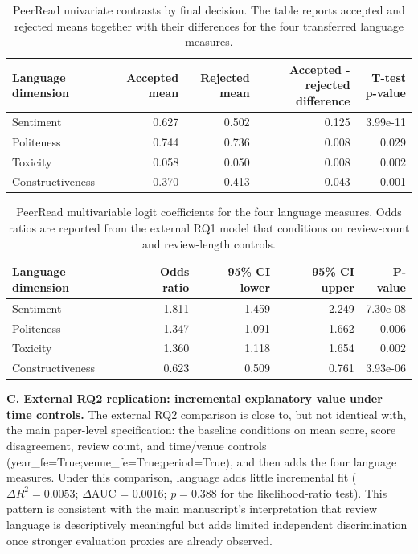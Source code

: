 \begin{table}[!htbp]
\centering
\begingroup
\small
\renewcommand{\arraystretch}{1.20}
\setlength{\tabcolsep}{6pt}
\caption{PeerRead univariate contrasts by final decision. The table reports accepted and rejected means together with their differences for the four transferred language measures.}
\label{tab:app:peerreadunivariate}
\begin{tabular}{lrrrr}
\toprule
Language dimension & Accepted mean & Rejected mean & Accepted - rejected difference & T-test p-value \\
\midrule
Sentiment & 0.627 & 0.502 & 0.125 & 3.99e-11 \\
Politeness & 0.744 & 0.736 & 0.008 & 0.029 \\
Toxicity & 0.058 & 0.050 & 0.008 & 0.002 \\
Constructiveness & 0.370 & 0.413 & -0.043 & 0.001 \\
\bottomrule
\end{tabular}
\endgroup
\end{table}

\begin{table}[!htbp]
\centering
\begingroup
\small
\renewcommand{\arraystretch}{1.20}
\setlength{\tabcolsep}{6pt}
\caption{PeerRead multivariable logit coefficients for the four language measures. Odds ratios are reported from the external RQ1 model that conditions on review-count and review-length controls.}
\label{tab:app:peerreadmultivariable}
\begin{tabular}{lrrrr}
\toprule
Language dimension & Odds ratio & 95\% CI lower & 95\% CI upper & P-value \\
\midrule
Sentiment & 1.811 & 1.459 & 2.249 & 7.30e-08 \\
Politeness & 1.347 & 1.091 & 1.662 & 0.006 \\
Toxicity & 1.360 & 1.118 & 1.654 & 0.002 \\
Constructiveness & 0.623 & 0.509 & 0.761 & 3.93e-06 \\
\bottomrule
\end{tabular}
\endgroup
\end{table}


\noindent\textbf{C. External RQ2 replication: incremental explanatory value under time controls.} The external RQ2 comparison is close to, but not identical with, the main paper-level specification: the baseline conditions on mean score, score disagreement, review count, and time/venue controls (year\_fe=True;venue\_fe=True;period=True), and then adds the four language measures. Under this comparison, language adds little incremental fit ($\Delta R^2 = 0.0053$; $\Delta$AUC = 0.0016; $p = 0.388$ for the likelihood-ratio test). This pattern is consistent with the main manuscript's interpretation that review language is descriptively meaningful but adds limited independent discrimination once stronger evaluation proxies are already observed.

